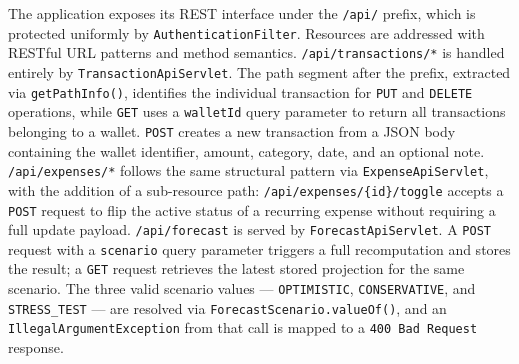 The application exposes its REST interface under the \texttt{/api/} prefix, which is
protected uniformly by \texttt{AuthenticationFilter}. Resources are addressed with
RESTful URL patterns and method semantics.
\texttt{/api/transactions/*} is handled entirely by \texttt{TransactionApiServlet}.
The path segment after the prefix, extracted via \texttt{getPathInfo()}, identifies
the individual transaction for \texttt{PUT} and \texttt{DELETE} operations, while
\texttt{GET} uses a \texttt{walletId} query parameter to return all transactions
belonging to a wallet. \texttt{POST} creates a new transaction from a JSON body
containing the wallet identifier, amount, category, date, and an optional note.
\texttt{/api/expenses/*} follows the same structural pattern via
\texttt{ExpenseApiServlet}, with the addition of a sub-resource path:
\texttt{/api/expenses/\{id\}/toggle} accepts a \texttt{POST} request to flip the
active status of a recurring expense without requiring a full update payload.
\texttt{/api/forecast} is served by \texttt{ForecastApiServlet}. A \texttt{POST}
request with a \texttt{scenario} query parameter triggers a full recomputation and
stores the result; a \texttt{GET} request retrieves the latest stored projection for
the same scenario. The three valid scenario values --- \texttt{OPTIMISTIC},
\texttt{CONSERVATIVE}, and \texttt{STRESS\_TEST} --- are resolved via
\texttt{ForecastScenario.valueOf()}, and an \texttt{IllegalArgumentException} from
that call is mapped to a \texttt{400 Bad Request} response.

























